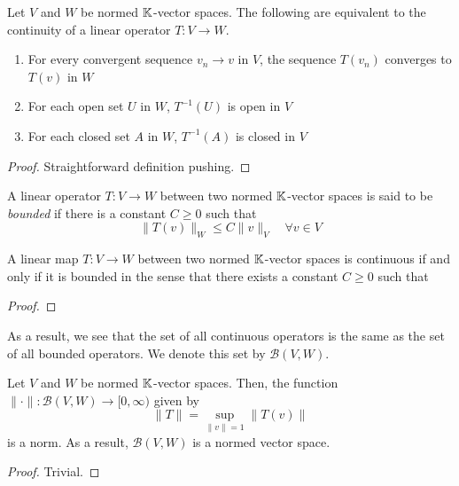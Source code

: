 \begin{proposition}
    Let $V$ and $W$ be normed $\mathbb K$-vector spaces. The following are equivalent to the continuity of a linear operator $T: V\to W$.
    \begin{enumerate}[label=(\alph*)]
    \item For every convergent sequence $v_n\to v$ in $V$, the sequence $T(v_n)$ converges to $T(v)$ in $W$ 
    \item For each open set $U$ in $W$, $T^{-1}(U)$ is open in $V$ 
    \item For each closed set $A$ in $W$, $T^{-1}(A)$ is closed in $V$
    \end{enumerate}
\end{proposition}
\begin{proof}
    Straightforward definition pushing.
\end{proof}

\begin{definition}
    A linear operator $T: V\to W$ between two normed $\mathbb K$-vector spaces is said to be \textit{bounded} if there is a constant $C\ge 0$ such that 
    \begin{equation*}
        \|T(v)\|_W\le C\|v\|_V\quad\forall v\in V
    \end{equation*}
\end{definition}

\begin{proposition}
    A linear map $T:V\to W$ between two normed $\mathbb K$-vector spaces is continuous if and only if it is bounded in the sense that there exists a constant $C\ge 0$ such that 
\end{proposition}
\begin{proof}
\end{proof}

As a result, we see that the set of all continuous operators is the same as the set of all bounded operators. We denote this set by $\mathcal B(V,W)$. 

\begin{proposition}
    Let $V$ and $W$ be normed $\mathbb K$-vector spaces. Then, the function $\|\cdot\|:\mathcal B(V,W)\to[0,\infty)$ given by 
    \begin{equation*}
        \|T\| = \sup_{\|v\| = 1}\|T(v)\|
    \end{equation*}
    is a norm. As a result, $\mathcal B(V,W)$ is a normed vector space.
\end{proposition}
\begin{proof}
    Trivial.
\end{proof}

